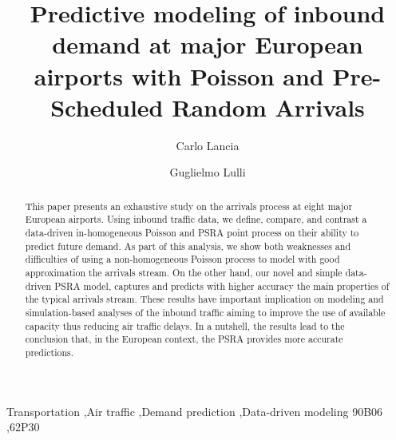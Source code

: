\documentclass[final,review]{elsarticle}
\begin{document}
\begin{frontmatter}

\title{Predictive modeling of inbound demand at major European airports with Poisson and Pre-Scheduled Random Arrivals}

\author[address_cl]{Carlo Lancia}

\author[address_gl]{Guglielmo Lulli}

\address[address_cl]{Leiden University Mathematical Institute, Niels Bohrweg 1, 2333 CA, Leiden, NL}
\address[address_gl]{Lancaster University Management School, Bailrigg, Lancaster, LA1 4YX, UK}

\begin{abstract}
  This paper presents an exhaustive study on the arrivals process at eight major European airports. Using inbound traffic data, we define, compare, and contrast a data-driven in-homogeneous Poisson and \ac{PSRA} point process on their ability to predict future demand.
As part of this analysis, we show both weaknesses and difficulties of using a non-homogeneous Poisson process to model with good approximation the arrivals stream. On the other hand, our novel and simple data-driven \ac{PSRA} model, captures and predicts with higher accuracy the main properties of the typical arrivals stream.
These results have important implication on modeling and simulation-based analyses of the inbound traffic aiming to improve the use of available capacity thus reducing air traffic delays. In a nutshell, the results lead to the conclusion that, in the European context, the \ac{PSRA} provides more accurate predictions.
\end{abstract}


\begin{keyword}
Transportation \sep Air traffic \sep Demand prediction \sep Data-driven modeling
\MSC[2010] 90B06 \sep  62P30
\end{keyword}

\end{frontmatter}
\end{document}
